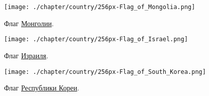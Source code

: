 \newpage
\begin{task}
\label{answer:population_density}
%
\begin{marginfigure}[1\baselineskip]
\centering\texttt{[image: ./chapter/country/256px-Flag\_of\_Mongolia.png]}%
\caption[Флаг Монголии.]{Флаг \href{https://w.wiki/mze}{Монголии}.}%
\label{fig:flag_mongolia}%
\end{marginfigure}

\begin{marginfigure}[1\baselineskip]
\centering\texttt{[image: ./chapter/country/256px-Flag\_of\_Israel.png]}
\caption[Флаг Израиля.]{Флаг \href{https://w.wiki/mzh}{Израиля}.}%
\label{fig:flag_israel}%
\end{marginfigure}

\begin{marginfigure}[1\baselineskip]
\centering\texttt{[image: ./chapter/country/256px-Flag\_of\_South\_Korea.png]}
\caption[Флаг Республики Кореи.]{Флаг \href{https://w.wiki/mzc}{Республики Кореи}.}%
\label{fig:flag_kor}%
\end{marginfigure}


\end{task}
